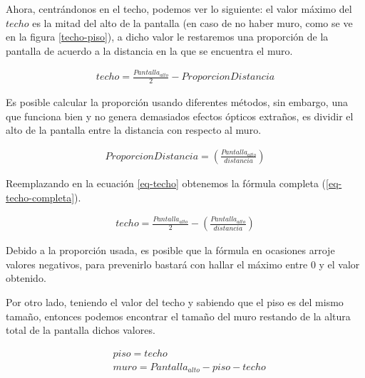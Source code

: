 Ahora, centrándonos en el techo, podemos ver lo siguiente: el valor máximo del $techo$ es la mitad del alto de la pantalla (en caso de no haber muro, como se ve en la figura \ref{techo-piso}), a dicho valor le restaremos una proporción de la pantalla de acuerdo a la distancia en la que se encuentra el muro.

\begin{equation}
\begin{aligned}
\label{eq-techo}
techo = \frac{Pantalla_{alto}}{2} - ProporcionDistancia
\end{aligned}
\end{equation}

Es posible calcular la proporción usando diferentes métodos, sin embargo, una que funciona bien y no genera demasiados efectos ópticos extraños, es dividir el alto de la pantalla entre la distancia con respecto al muro. 

\begin{equation}
\begin{aligned}
\label{eq-propdist}
ProporcionDistancia = \left(\frac{Pantalla_{alto}}{distancia}\right)
\end{aligned}
\end{equation}

Reemplazando en la ecuación \ref{eq-techo} obtenemos la fórmula completa (\ref{eq-techo-completa}).

\begin{equation}
\begin{aligned}
\label{eq-techo-completa}
techo = \frac{Pantalla_{alto}}{2} - \left(\frac{Pantalla_{alto}}{distancia}\right)
\end{aligned}
\end{equation}


Debido a la proporción usada, es posible que la fórmula en ocasiones arroje valores negativos, para prevenirlo bastará con hallar el máximo entre 0 y el valor obtenido.

Por otro lado, teniendo el valor del techo y sabiendo que el piso es del mismo tamaño, entonces podemos encontrar el tamaño del muro restando de la altura total de la pantalla dichos valores.

\begin{equation}
\begin{aligned}
\label{eq-muros}
& piso = techo \\
& muro = Pantalla_{alto} - piso - techo \\
\end{aligned}
\end{equation}


